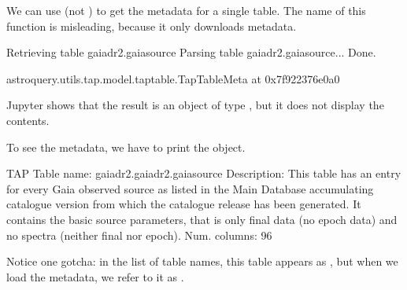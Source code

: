 \documentclass[letterpaper,10pt,english]{sphinxmanual}
\begin{document}
We can use  (not ) to get the metadata for a single table.  The name of this function is misleading, because it only downloads metadata.

\begin{sphinxVerbatim}[commandchars=\\\{\}]
  
\end{sphinxVerbatim}

\begin{sphinxVerbatim}[commandchars=\\\{\}]
Retrieving table \PYGZsq{}gaiadr2.gaia\PYGZus{}source\PYGZsq{}
Parsing table \PYGZsq{}gaiadr2.gaia\PYGZus{}source\PYGZsq{}...
Done.
\end{sphinxVerbatim}

\begin{sphinxVerbatim}[commandchars=\\\{\}]
\PYGZlt{}astroquery.utils.tap.model.taptable.TapTableMeta at 0x7f922376e0a0\PYGZgt{}
\end{sphinxVerbatim}

Jupyter shows that the result is an object of type , but it does not display the contents.

To see the metadata, we have to print the object.

\begin{sphinxVerbatim}[commandchars=\\\{\}]
\end{sphinxVerbatim}

\begin{sphinxVerbatim}[commandchars=\\\{\}]
TAP Table name: gaiadr2.gaiadr2.gaia\PYGZus{}source
Description: This table has an entry for every Gaia observed source as listed in the
Main Database accumulating catalogue version from which the catalogue
release has been generated. It contains the basic source parameters,
that is only final data (no epoch data) and no spectra (neither final
nor epoch).
Num. columns: 96
\end{sphinxVerbatim}

Notice one gotcha: in the list of table names, this table appears as , but when we load the metadata, we refer to it as .
\end{document}
